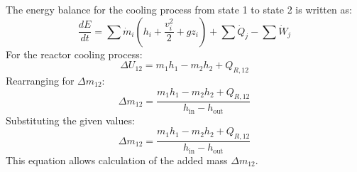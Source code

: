 The energy balance for the cooling process from state 1 to state 2 is written as:  
\[
\frac{dE}{dt} = \sum \dot{m}_i \left( h_i + \frac{v_i^2}{2} + gz_i \right) + \sum \dot{Q}_j - \sum \dot{W}_j
\]  
For the reactor cooling process:  
\[
\Delta U_{12} = m_1 h_1 - m_2 h_2 + Q_{R,12}
\]  
Rearranging for \( \Delta m_{12} \):  
\[
\Delta m_{12} = \frac{m_1 h_1 - m_2 h_2 + Q_{R,12}}{h_{\text{in}} - h_{\text{out}}}
\]  
Substituting the given values:  
\[
\Delta m_{12} = \frac{m_1 h_1 - m_2 h_2 + Q_{R,12}}{h_{\text{in}} - h_{\text{out}}}
\]  
This equation allows calculation of the added mass \( \Delta m_{12} \).